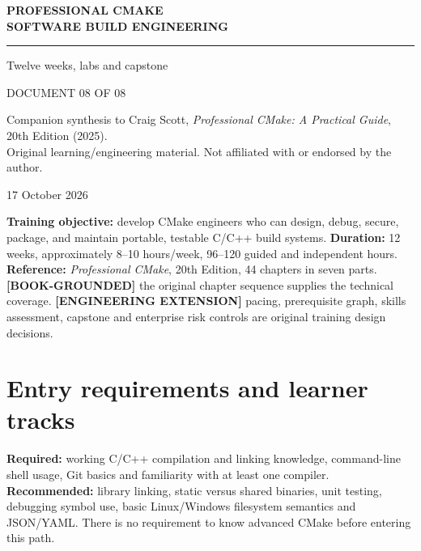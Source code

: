 \documentclass[11pt,letterpaper,oneside]{report}
\begin{document}
\hypersetup{pageanchor=false}\begin{titlepage}
\color{navy}
\vspace*{1.15in}
{\Large\bfseries PROFESSIONAL CMAKE\\[7pt]SOFTWARE BUILD ENGINEERING\par}
\vspace{0.32in}\noindent\textcolor{teal}{\rule{0.9\linewidth}{2.3pt}}\par
\vspace{0.45in}
\par
\vspace{0.3in}
{\Large\color{teal}Twelve weeks, labs and capstone\par}
\vfill
{\large DOCUMENT 08 OF 08\par}
\vspace{0.1in}
{\small Companion synthesis to Craig Scott, \emph{Professional CMake: A Practical Guide}, 20th Edition (2025).\\
Original learning/engineering material. Not affiliated with or endorsed by the author.\par}
\vspace{0.2in}
{\small 17 October 2026\par}
\end{titlepage}
\hypersetup{pageanchor=true}\clearpage{}\tableofcontents\clearpage{}

\textbf{Training objective:} develop CMake engineers who can design,
debug, secure, package, and maintain portable, testable C/C++ build
systems. \textbf{Duration:} 12 weeks, approximately 8--10 hours/week,
96--120 guided and independent hours. \textbf{Reference:}
\emph{Professional CMake}, 20th Edition, 44 chapters in seven parts.
\textbf{{[}BOOK-GROUNDED{]}} the original chapter sequence supplies the
technical coverage. \textbf{{[}ENGINEERING EXTENSION{]}} pacing,
prerequisite graph, skills assessment, capstone and enterprise risk
controls are original training design decisions.

\chapter{Entry requirements and learner
tracks}\label{entry-requirements-and-learner-tracks}

\textbf{Required:} working C/C++ compilation and linking knowledge,
command-line shell usage, Git basics and familiarity with at least one
compiler. \textbf{Recommended:} library linking, static versus shared
binaries, unit testing, debugging symbol use, basic Linux/Windows
filesystem semantics and JSON/YAML. There is no requirement to know
advanced CMake before entering this path.
\end{document}
